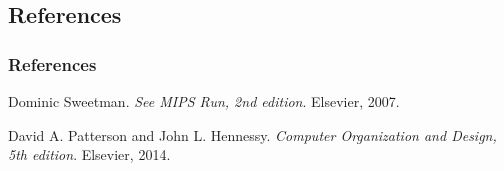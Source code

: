 \begin{frame}

\section{References}

\frametitle{References}

\begin{thebibliography}{9}

 Dominic
Sweetman.  \emph{See MIPS\textsuperscript{\textregistered} Run, 2nd edition}.
Elsevier, 2007.

 David A. Patterson and John L. Hennessy. \emph{Computer
Organization and Design, 5th edition}. Elsevier, 2014.

\end{thebibliography}

\end{frame}
